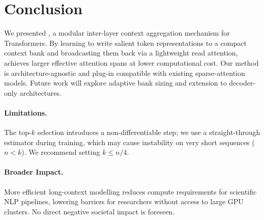 \section{Conclusion}
\label{sec:conclusion}

We presented \modelname{}, a modular inter-layer context aggregation mechanism
for Transformers. By learning to write salient token representations to a compact
context bank and broadcasting them back via a lightweight read attention,
\modelname{} achieves larger effective attention spans at lower computational
cost. Our method is architecture-agnostic and plug-in compatible with existing
sparse-attention models. Future work will explore adaptive bank sizing and
extension to decoder-only architectures.

\paragraph{Limitations.}
The top-$k$ selection introduces a non-differentiable step; we use a straight-through
estimator during training, which may cause instability on very short sequences
($n < k$). We recommend setting $k \leq n/4$.

\paragraph{Broader Impact.}
More efficient long-context modelling reduces compute requirements for scientific
NLP pipelines, lowering barriers for researchers without access to large GPU clusters.
No direct negative societal impact is foreseen.

